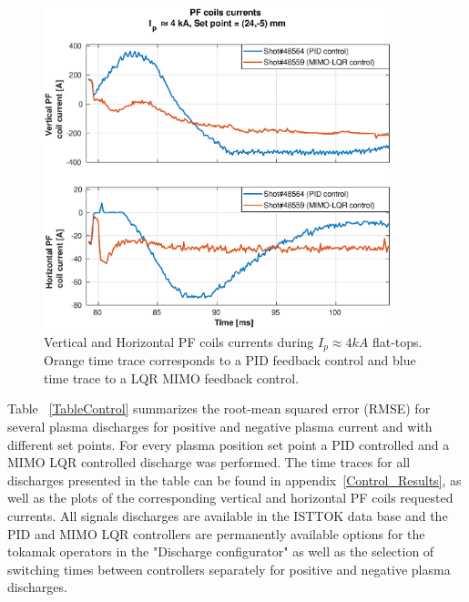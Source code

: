 \begin{figure}[h]
	\centering
	\includegraphics[width=0.9\textwidth]{Chp5/PIDvsMIMO_564_559_curr_2.eps}
	\caption{Vertical and Horizontal PF coils currents during  $I_p\approx 4kA$  flat-tops. Orange time trace corresponds to a PID feedback control and blue time trace to a LQR MIMO feedback control.\label{564_559curr}}
\end{figure}


 Table ~\ref{TableControl} summarizes the root-mean squared error (RMSE) for several plasma discharges for positive and negative plasma current and with different set points. For every plasma position set point a PID controlled and a MIMO LQR controlled discharge was performed. The time traces for all discharges presented in the table can be found in appendix~\ref{Control_Results}, as well as the plots of the corresponding vertical and horizontal PF coils requested currents. All signals discharges are available in the ISTTOK data base and the PID and MIMO LQR controllers are permanently available options for the tokamak operators in the "Discharge configurator" as well as the selection of switching times between controllers separately for positive and negative plasma discharges.\smallskip

